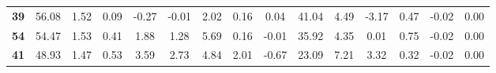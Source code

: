 \documentclass[withoutpreface,bwprint]{cumcmthesis} %
\begin{document}
\begin{appendices}
\begin{table}[!h]
\begin{tabular}{@{}ccccccccccccccc@{}}
			\textbf{39}      & 56.08                                                          & 1.52                                                          & 0.09                                                         & -0.27                                                        & -0.01                                                        & 2.02                                                           & 0.16                                                           & 0.04                                                         & 41.04                                                        & 4.49                                                         & -3.17                                                           & 0.47                                                         & -0.02                                                         & 0.00                                                          \\
			\textbf{54}      & 54.47                                                          & 1.53                                                          & 0.41                                                         & 1.88                                                         & 1.28                                                         & 5.69                                                           & 0.16                                                           & -0.01                                                        & 35.92                                                        & 4.35                                                         & 0.01                                                            & 0.75                                                         & -0.02                                                         & 0.00                                                          \\
			\textbf{41}      & 48.93                                                          & 1.47                                                          & 0.53                                                         & 3.59                                                         & 2.73                                                         & 4.84                                                           & 2.01                                                           & -0.67                                                        & 23.09                                                        & 7.21                                                         & 3.32                                                            & 0.32                                                         & -0.02                                                         & 0.00                                                          \\

\end{tabular}
\end{table}
\end{appendices}
\end{document}
